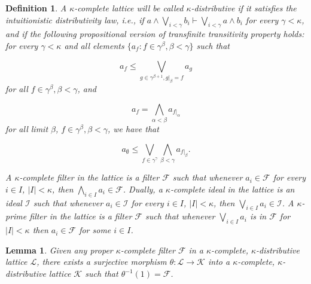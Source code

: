 \documentclass[a4paper,11pt]{article}
\theoremstyle{plain}
\newtheorem{lemma}[thm]{Lemma}
\theoremstyle{plain}
\newtheorem{defs}[thm]{Definition}
\theoremstyle{remark}
\begin{document}
\begin{defs}
A $\kappa$-complete lattice will be called $\kappa$-distributive if it satisfies the intuitionistic distributivity law, i.e., if $a \wedge \bigvee_{i<\gamma} b_{i} \vdash \bigvee_{i<\gamma}a \wedge b_{i}$ for every $\gamma<\kappa$, and if the following propositional version of transfinite transitivity property holds:   for every $\gamma<\kappa$ and all elements $\{a_f: f \in \gamma^{\beta}, \beta<\gamma\}$  such that 

$$a_{f} \leq \bigvee_{g \in \gamma^{\beta+1}, g|_{\beta}=f} a_{g}$$
\noindent for all $f \in \gamma^{\beta}, \beta<\gamma$, and 

$$a_{f} = \bigwedge_{\alpha<\beta}a_{f|_{\alpha}}$$
\noindent for all limit $\beta$, $f \in \gamma^{\beta}, \beta<\gamma$, we have that 

$$a_{\emptyset} \leq \bigvee_{f \in \gamma^{\gamma}} \bigwedge_{\beta<\gamma}a_{f|_{\beta}}.$$

A $\kappa$-complete filter in the lattice is a filter $\mathcal{F}$ such that whenever $a_i \in \mathcal{F}$ for every $i \in I$, $|I|<\kappa$, then $\bigwedge_{i \in I}a_i \in \mathcal{F}$. Dually, a $\kappa$-complete ideal in the lattice is an ideal $\mathcal{I}$ such that whenever $a_i \in \mathcal{I}$ for every $i \in I$, $|I|<\kappa$, then $\bigvee_{i \in I}a_i \in \mathcal{I}$. A $\kappa$-prime filter in the lattice is a filter $\mathcal{F}$ such that whenever $\bigvee_{i \in I}a_i$ is in $\mathcal{F}$ for $|I|<\kappa$ then $a_i \in \mathcal{F}$ for some $i \in I$.
\end{defs}

\begin{lemma}\label{quotient}
 Given any proper $\kappa$-complete filter $\mathcal{F}$ in a $\kappa$-complete, $\kappa$-distributive lattice $\mathcal{L}$, there exists a surjective morphism $\theta: \mathcal{L} \to \mathcal{K}$ into a $\kappa$-complete, $\kappa$-distributive lattice $\mathcal{K}$ such that $\theta^{-1}(1)=\mathcal{F}$.
\end{lemma} 
\end{document}
